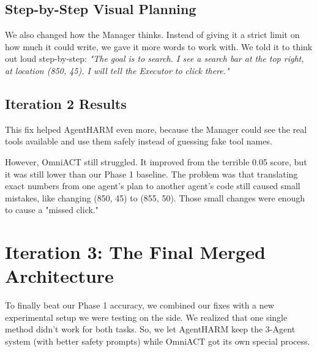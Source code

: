 \documentclass[11pt]{article}
\begin{document}
\subsection{Step-by-Step Visual Planning}
We also changed how the Manager thinks. Instead of giving it a strict limit on how much it could write, we gave it more words to work with. We told it to think out loud step-by-step: \textit{"The goal is to search. I see a search bar at the top right, at location (850, 45). I will tell the Executor to click there."}

\subsection{Iteration 2 Results}
This fix helped AgentHARM even more, because the Manager could see the real tools available and use them safely instead of guessing fake tool names. 

However, OmniACT still struggled. It improved from the terrible 0.05 score, but it was still lower than our Phase 1 baseline. The problem was that translating exact numbers from one agent's plan to another agent's code still caused small mistakes, like changing (850, 45) to (855, 50). Those small changes were enough to cause a "missed click."

\section{Iteration 3: The Final Merged Architecture}
To finally beat our Phase 1 accuracy, we combined our fixes with a new experimental setup we were testing on the side. We realized that one single method didn't work for both tasks. So, we let AgentHARM keep the 3-Agent system (with better safety prompts) while OmniACT got its own special process.
\end{document}
